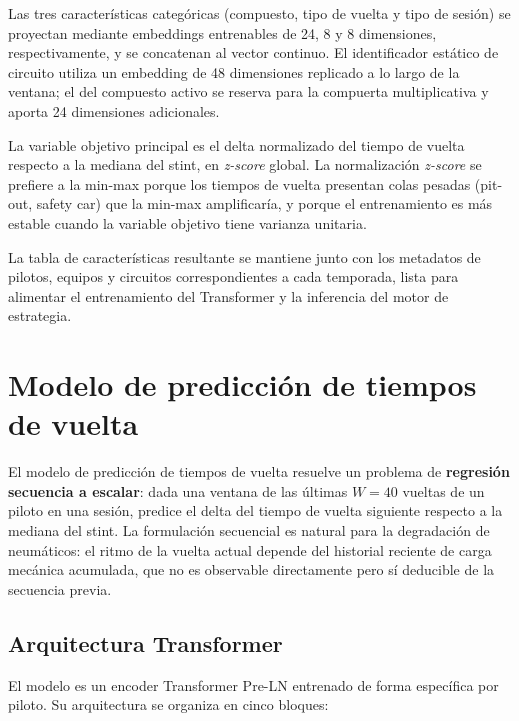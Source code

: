 Las tres características categóricas (compuesto, tipo de vuelta y tipo de sesión) se proyectan mediante embeddings entrenables de 24, 8 y 8 dimensiones, respectivamente, y se concatenan al vector continuo. El identificador estático de circuito utiliza un embedding de 48 dimensiones replicado a lo largo de la ventana; el del compuesto activo se reserva para la compuerta multiplicativa y aporta 24 dimensiones adicionales.

La variable objetivo principal es el delta normalizado del tiempo de vuelta respecto a la mediana del stint, en \textit{z-score} global. La normalización \textit{z-score} se prefiere a la min-max porque los tiempos de vuelta presentan colas pesadas (pit-out, safety car) que la min-max amplificaría, y porque el entrenamiento es más estable cuando la variable objetivo tiene varianza unitaria.

La tabla de características resultante se mantiene junto con los metadatos de pilotos, equipos y circuitos correspondientes a cada temporada, lista para alimentar el entrenamiento del Transformer y la inferencia del motor de estrategia.

\section{Modelo de predicción de tiempos de vuelta}
\label{sec:modelo_transformer}

El modelo de predicción de tiempos de vuelta resuelve un problema de \textbf{regresión secuencia a escalar}: dada una ventana de las últimas $W = 40$ vueltas de un piloto en una sesión, predice el delta del tiempo de vuelta siguiente respecto a la mediana del stint. La formulación secuencial es natural para la degradación de neumáticos: el ritmo de la vuelta actual depende del historial reciente de carga mecánica acumulada, que no es observable directamente pero sí deducible de la secuencia previa.

\subsection{Arquitectura Transformer}
\label{ssec:arquitectura_transformer}

El modelo es un encoder Transformer Pre-LN \cite{vaswani2017attention,xiong2020layernorm} entrenado de forma específica por piloto. Su arquitectura se organiza en cinco bloques:

